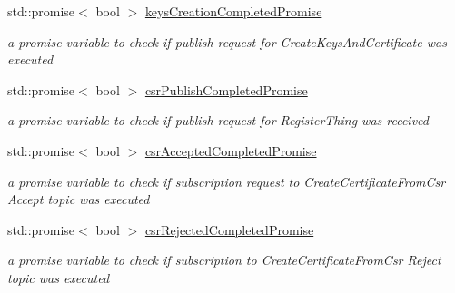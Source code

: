 \begin{DoxyCompactItemize}
std\+::promise$<$ bool $>$ \hyperlink{class_aws_1_1_iot_1_1_device_client_1_1_fleet_provisioning_aafc3ae225f3d888c1439011db5393b95}{keys\+Creation\+Completed\+Promise}
\begin{DoxyCompactList}\small\item\em a promise variable to check if publish request for Create\+Keys\+And\+Certificate was executed \end{DoxyCompactList}\item 
\mbox{\label{class_aws_1_1_iot_1_1_device_client_1_1_fleet_provisioning_a65d4080ed16a11894450e63ec3f9ef69}} 
std\+::promise$<$ bool $>$ \hyperlink{class_aws_1_1_iot_1_1_device_client_1_1_fleet_provisioning_a65d4080ed16a11894450e63ec3f9ef69}{csr\+Publish\+Completed\+Promise}
\begin{DoxyCompactList}\small\item\em a promise variable to check if publish request for Register\+Thing was received \end{DoxyCompactList}\item 
\mbox{\label{class_aws_1_1_iot_1_1_device_client_1_1_fleet_provisioning_ad8245e3c483d250e671e5db6daf2172d}} 
std\+::promise$<$ bool $>$ \hyperlink{class_aws_1_1_iot_1_1_device_client_1_1_fleet_provisioning_ad8245e3c483d250e671e5db6daf2172d}{csr\+Accepted\+Completed\+Promise}
\begin{DoxyCompactList}\small\item\em a promise variable to check if subscription request to Create\+Certificate\+From\+Csr Accept topic was executed \end{DoxyCompactList}\item 
\mbox{\label{class_aws_1_1_iot_1_1_device_client_1_1_fleet_provisioning_af12cc3b90aeaf3520c94c813fb6fc216}} 
std\+::promise$<$ bool $>$ \hyperlink{class_aws_1_1_iot_1_1_device_client_1_1_fleet_provisioning_af12cc3b90aeaf3520c94c813fb6fc216}{csr\+Rejected\+Completed\+Promise}
\begin{DoxyCompactList}\small\item\em a promise variable to check if subscription to Create\+Certificate\+From\+Csr Reject topic was executed \end{DoxyCompactList}\item 

\end{DoxyCompactItemize}
